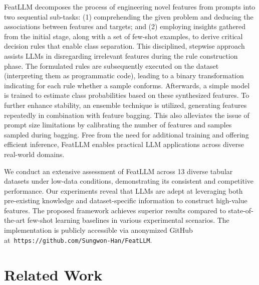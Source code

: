 \textsf{FeatLLM} decomposes the process of engineering novel features from prompts into two sequential sub-tasks: (1) comprehending the given problem and deducing the associations between features and targets; and (2) employing insights gathered from the initial stage, along with a set of few-shot examples, to derive critical decision rules that enable class separation. This disciplined, stepwise approach assists LLMs in disregarding irrelevant features during the rule construction phase. The formulated rules are subsequently executed on the dataset (interpreting them as programmatic code), leading to a binary transformation indicating for each rule whether a sample conforms. Afterwards, a simple model is trained to estimate class probabilities based on these synthesized features. To further enhance stability, an ensemble technique is utilized, generating features repeatedly in combination with feature bagging. This also alleviates the issue of prompt size limitations by calibrating the number of features and samples sampled during bagging. Free from the need for additional training and offering efficient inference, \textsf{FeatLLM} enables practical LLM applications across diverse real-world domains.

We conduct an extensive assessment of \textsf{FeatLLM} across 13 diverse tabular datasets under low-data conditions, demonstrating its consistent and competitive performance. Our experiments reveal that LLMs are adept at leveraging both pre-existing knowledge and dataset-specific information to construct high-value features. The proposed framework achieves superior results compared to state-of-the-art few-shot learning baselines in various experimental scenarios. The implementation is publicly accessible via anonymized GitHub at~\texttt{https://github.com/Sungwon-Han/FeatLLM}.

\section{Related Work}

